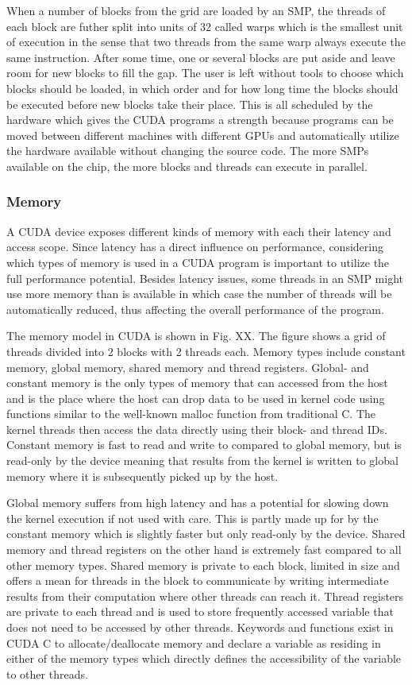 When a number of blocks from the grid are loaded by an SMP, the threads of each block are futher split into units of 32 called warps which is the smallest unit of execution in the sense that two threads from the same warp always execute the same instruction. After some time, one or several blocks are put aside and leave room for new blocks to fill the gap. The user is left without tools to choose which blocks should be loaded, in which order and for how long time the blocks should be executed before new blocks take their place. This is all scheduled by the hardware which gives the CUDA programs a strength because programs can be moved between different machines with different GPUs and automatically utilize the hardware available without changing the source code. The more SMPs available on the chip, the more blocks and threads can execute in parallel.

\subsubsection{Memory}
A CUDA device exposes different kinds of memory with each their latency and access scope. Since latency has a direct influence on performance, considering which types of memory is used in a CUDA program is important to utilize the full performance potential. Besides latency issues, some threads in an SMP might use more memory than is available in which case the number of threads will be automatically reduced, thus affecting the overall performance of the program. 

The memory model in CUDA is shown in Fig. XX. The figure shows a grid of threads divided into 2 blocks with 2 threads each. Memory types include constant memory, global memory, shared memory and thread registers. Global- and constant memory is the only types of memory that can accessed from the host and is the place where the host can drop data to be used in kernel code using functions similar to the well-known malloc function from traditional C. The kernel threads then access the data directly using their block- and thread IDs. Constant memory is fast to read and write to compared to global memory, but is read-only by the device meaning that results from the kernel is written to global memory where it is subsequently picked up by the host.

Global memory suffers from high latency and has a potential for slowing down the kernel execution if not used with care. This is partly made up for by the constant memory which is slightly faster but only read-only by the device. Shared memory and thread registers on the other hand is extremely fast compared to all other memory types. Shared memory is private to each block, limited in size and offers a mean for threads in the block to communicate by writing intermediate results from their computation where other threads can reach it. Thread registers are private to each thread and is used to store frequently accessed variable that does not need to be accessed by other threads. Keywords and functions exist in CUDA C to allocate/deallocate memory and declare a variable as residing in either of the memory types which directly defines the accessibility of the variable to other threads.
